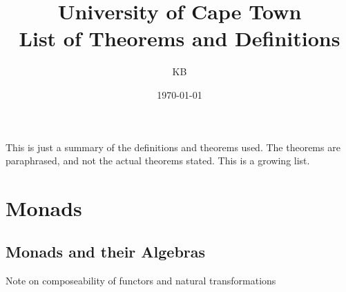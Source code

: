 \documentclass{tufte-handout} %
\title{	
	\normalfont\normalsize 
	{University of Cape Town} \\ [0pt] %
	\huge List of Theorems and Definitions%
}\author{KB} %
\date{\vspace{-5pt}\normalsize\today} %
\theoremstyle{theorem}
\theoremstyle{definition}
\theoremstyle{remark}
\theoremstyle{remark}
\begin{document}
	\justifying 
	\maketitle

This is just a summary of the definitions and theorems used.
The theorems are paraphrased, and not the actual theorems stated.
This is a growing list.
	
\section{Monads}
\subsection{Monads and their Algebras}


		Note on composeability of functors and natural transformations
		
\end{document}

